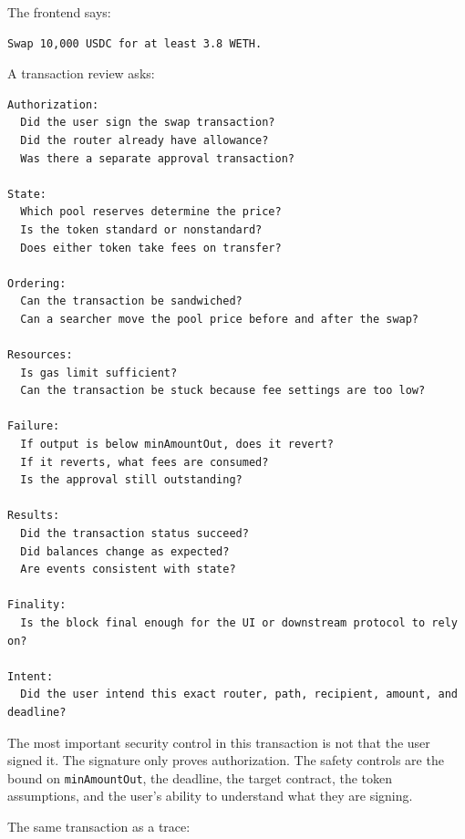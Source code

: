 The frontend says:

\begin{lstlisting}
Swap 10,000 USDC for at least 3.8 WETH.
\end{lstlisting}

A transaction review asks:

\begin{lstlisting}
Authorization:
  Did the user sign the swap transaction?
  Did the router already have allowance?
  Was there a separate approval transaction?

State:
  Which pool reserves determine the price?
  Is the token standard or nonstandard?
  Does either token take fees on transfer?

Ordering:
  Can the transaction be sandwiched?
  Can a searcher move the pool price before and after the swap?

Resources:
  Is gas limit sufficient?
  Can the transaction be stuck because fee settings are too low?

Failure:
  If output is below minAmountOut, does it revert?
  If it reverts, what fees are consumed?
  Is the approval still outstanding?

Results:
  Did the transaction status succeed?
  Did balances change as expected?
  Are events consistent with state?

Finality:
  Is the block final enough for the UI or downstream protocol to rely on?

Intent:
  Did the user intend this exact router, path, recipient, amount, and deadline?
\end{lstlisting}

The most important security control in this transaction is not that the
user signed it. The signature only proves authorization. The safety
controls are the bound on \passthrough{\lstinline!minAmountOut!}, the
deadline, the target contract, the token assumptions, and the user's
ability to understand what they are signing.

The same transaction as a trace:

